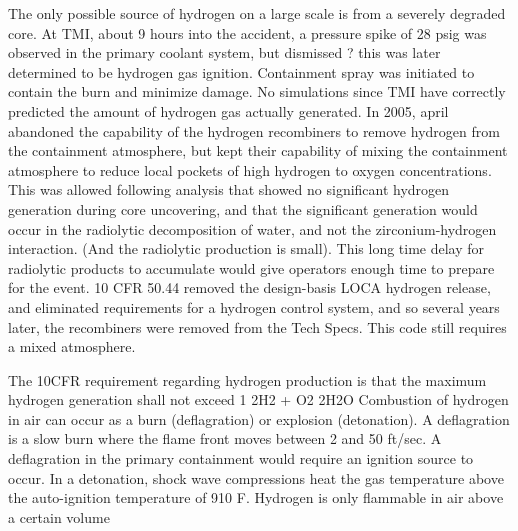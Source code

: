\documentclass[10pt]{article}
\begin{document}
The only possible source of hydrogen on a large scale is from a severely degraded core. At TMI, about 9 hours into the accident, a pressure spike of 28 psig was observed in the primary coolant system, but dismissed ? this was later determined to be hydrogen gas ignition. Containment spray was initiated to contain the burn and minimize damage. No simulations since TMI have correctly predicted the amount of hydrogen gas actually generated. In 2005, april abandoned the capability of the hydrogen recombiners to remove hydrogen from the containment atmosphere, but kept their capability of mixing the containment atmosphere to reduce local pockets of high hydrogen to oxygen concentrations. This was allowed following analysis that showed no significant hydrogen generation during core uncovering, and that the significant generation would occur in the radiolytic decomposition of water, and not the zirconium-hydrogen interaction. (And the radiolytic production is small). This long time delay for radiolytic products to accumulate would give operators enough time to prepare for the event. 10 CFR 50.44 removed the design-basis LOCA hydrogen release, and eliminated requirements for a hydrogen control system, and so several years later, the recombiners were removed from the Tech Specs. This code still requires a mixed atmosphere. 

The 10CFR requirement regarding hydrogen production is that the maximum hydrogen generation shall not exceed 1%
2H2 + O2  2H2O
Combustion of hydrogen in air can occur as a burn (deflagration) or explosion (detonation). A deflagration is a slow burn where the flame front moves between 2 and 50 ft/sec. A deflagration in the primary containment would require an ignition source to occur. In a detonation, shock wave compressions heat the gas temperature above the auto-ignition temperature of 910 F. Hydrogen is only flammable in air above a certain volume %
\end{document}
